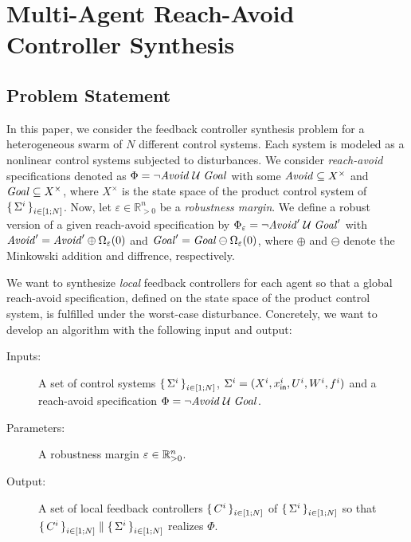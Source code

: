 
\section{Multi-Agent Reach-Avoid Controller Synthesis}
\label{sec:problem}

\subsection{Problem Statement}
In this paper, we consider the feedback controller synthesis problem for a heterogeneous swarm of $N$ different control systems.
Each system is modeled as a nonlinear control systems subjected to disturbances. We consider \emph{reach-avoid} specifications denoted as $\Phi=\lnot\mathit{Avoid}\;\mathcal{U}\;\mathit{Goal}$ with some $\mathit{Avoid}\subseteq X^\times$ and $\mathit{Goal}\subseteq X^\times$, where $X^\times$ is the state space of the product control system of $\set{\Sigma^i}_{i\in [1;N]}$. Now, let $\varepsilon\in \mathbb{R}^n_{>0}$ be a \emph{robustness margin}. We define a robust version of a given reach-avoid specification by $\Phi_\varepsilon=\lnot\mathit{Avoid}'\;\mathcal{U}\;\mathit{Goal}'$ with $\mathit{Avoid}'=\mathit{Avoid}'\oplus\Omega_\varepsilon(0)$ and $\mathit{Goal}'=\mathit{Goal}\ominus\Omega_\varepsilon(0)$, where $\oplus$ and $\ominus$ denote the Minkowski addition and diffrence, respectively. %

We want to synthesize \emph{local} feedback controllers for each agent so that a global reach-avoid specification, defined on the state space of the product control system, is fulfilled under the worst-case disturbance.
Concretely, we want to develop an algorithm with the following input and output:
\begin{description}
	\item[Inputs:] A set of control systems $\set{\Sigma^i}_{i\in [1;N]}$, $\Sigma^i=(X^i,x_{\mathsf{in}}^i,U^i,W^i,f^i)$ and a reach-avoid specification $\Phi=\lnot\mathit{Avoid}\;\mathcal{U}\;\mathit{Goal}$.%
	\item[Parameters:] A robustness margin $\varepsilon\in \mathbb{R}^n_{>0}$.%
	\item[Output:] A set of local feedback controllers $\set{C^i}_{i\in [1;N]}$ of $\set{\Sigma^i}_{i\in [1;N]}$ so that $\set{C^i}_{i\in [1;N]}\parallel \set{\Sigma^i}_{i\in [1;N]}$ realizes $\Phi$. 
\end{description}


